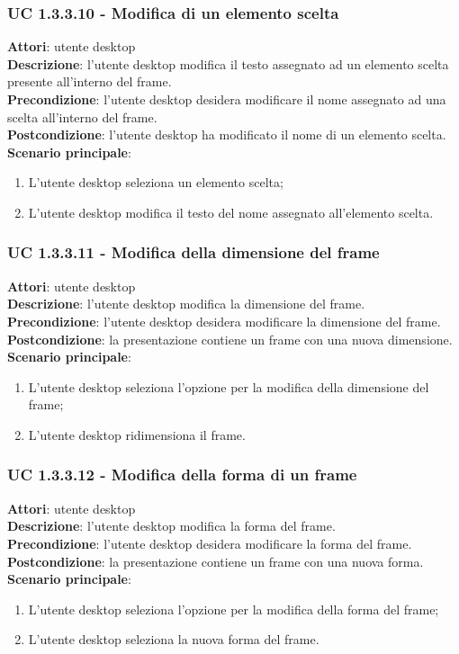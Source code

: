 \subsubsection{UC 1.3.3.10 - Modifica di un elemento scelta}{
	\label{uc1.3.3.10}
	\textbf{Attori}: utente desktop \\
	\textbf{Descrizione}: l'utente desktop modifica il testo assegnato ad un elemento scelta presente all'interno del frame. \\
	\textbf{Precondizione}: l'utente desktop desidera modificare il nome assegnato ad una scelta all'interno del frame.	\\
	\textbf{Postcondizione}: l'utente desktop ha modificato il nome di un elemento scelta.	\\
	\textbf{Scenario principale}:
	\begin{enumerate}
		\item L'utente desktop seleziona un elemento scelta;
		\item L'utente desktop modifica il testo del nome assegnato all'elemento scelta.
	\end{enumerate}
	}
\subsubsection{UC 1.3.3.11 - Modifica della dimensione del frame}{
	\label{uc1.3.3.11}
	\textbf{Attori}: utente desktop \\
	\textbf{Descrizione}: l'utente desktop modifica la dimensione del frame. \\
	\textbf{Precondizione}: l'utente desktop desidera modificare la dimensione del frame.	\\
	\textbf{Postcondizione}: la presentazione contiene un frame con una nuova dimensione.	\\
	\textbf{Scenario principale}:
	\begin{enumerate}
		\item L'utente desktop seleziona l'opzione per la modifica della dimensione del frame;
		\item L'utente desktop ridimensiona il frame.
	\end{enumerate}
	}
\subsubsection{UC 1.3.3.12 - Modifica della forma di un frame}{
	\label{uc1.3.3.12}
	\textbf{Attori}: utente desktop \\
	\textbf{Descrizione}: l'utente desktop modifica la forma del frame. \\
	\textbf{Precondizione}: l'utente desktop desidera modificare la forma del frame.	\\
	\textbf{Postcondizione}: la presentazione contiene un frame con una nuova forma.	\\
	\textbf{Scenario principale}:
	\begin{enumerate}
		\item L'utente desktop seleziona l'opzione per la modifica della forma del frame;
		\item L'utente desktop seleziona la nuova forma del frame.
	\end{enumerate}
	}

